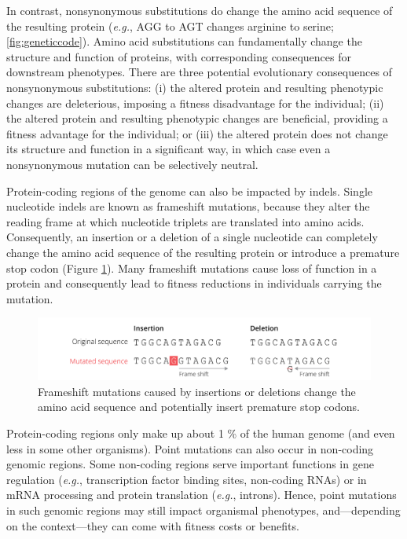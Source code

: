 \documentclass[
]{book}
\begin{document}
In contrast, nonsynonymous substitutions do change the amino acid sequence of the resulting protein (\emph{e.g.}, AGG to AGT changes arginine to serine; \ref{fig:geneticcode}). Amino acid substitutions can fundamentally change the structure and function of proteins, with corresponding consequences for downstream phenotypes. There are three potential evolutionary consequences of nonsynonymous substitutions: (i) the altered protein and resulting phenotypic changes are deleterious, imposing a fitness disadvantage for the individual; (ii) the altered protein and resulting phenotypic changes are beneficial, providing a fitness advantage for the individual; or (iii) the altered protein does not change its structure and function in a significant way, in which case even a nonsynonymous mutation can be selectively neutral.

Protein-coding regions of the genome can also be impacted by indels. Single nucleotide indels are known as frameshift mutations, because they alter the reading frame at which nucleotide triplets are translated into amino acids. Consequently, an insertion or a deletion of a single nucleotide can completely change the amino acid sequence of the resulting protein or introduce a premature stop codon (Figure \ref{fig:frameshift}). Many frameshift mutations cause loss of function in a protein and consequently lead to fitness reductions in individuals carrying the mutation.

\begin{figure}
\includegraphics[width=1\linewidth]{images/insertion} \caption{Frameshift mutations caused by insertions or deletions change the amino acid sequence and potentially insert premature stop codons.}\label{fig:frameshift}
\end{figure}

Protein-coding regions only make up about 1 \% of the human genome (and even less in some other organisms). Point mutations can also occur in non-coding genomic regions. Some non-coding regions serve important functions in gene regulation (\emph{e.g.}, transcription factor binding sites, non-coding RNAs) or in mRNA processing and protein translation (\emph{e.g.}, introns). Hence, point mutations in such genomic regions may still impact organismal phenotypes, and---depending on the context---they can come with fitness costs or benefits.
\end{document}
